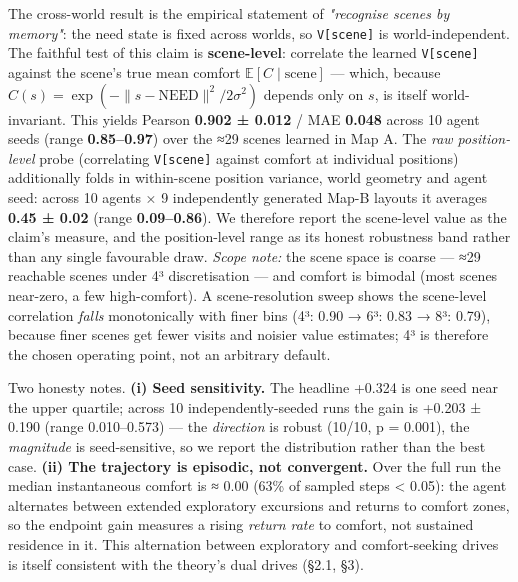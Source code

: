 \documentclass[11pt]{article}
\begin{document}
The cross-world result is the empirical statement of \emph{"recognise scenes by memory"}: the need state is fixed across worlds, so \texttt{V[scene]} is world-independent. The faithful test of this claim is \textbf{scene-level}: correlate the learned \texttt{V[scene]} against the scene's true mean comfort $\mathbb{E}[C \mid \text{scene}]$ — which, because $C(s)=\exp(-\lVert s-\text{NEED}\rVert^2/2\sigma^2)$ depends only on $s$, is itself world-invariant. This yields Pearson \textbf{0.902 ± 0.012} / MAE \textbf{0.048} across 10 agent seeds (range \textbf{0.85–0.97}) over the ≈29 scenes learned in Map A. The \emph{raw position-level} probe (correlating \texttt{V[scene]} against comfort at individual positions) additionally folds in within-scene position variance, world geometry and agent seed: across 10 agents × 9 independently generated Map-B layouts it averages \textbf{0.45 ± 0.02} (range \textbf{0.09–0.86}). We therefore report the scene-level value as the claim's measure, and the position-level range as its honest robustness band rather than any single favourable draw. \emph{Scope note:} the scene space is coarse — ≈29 reachable scenes under 4³ discretisation — and comfort is bimodal (most scenes near-zero, a few high-comfort). A scene-resolution sweep shows the scene-level correlation \emph{falls} monotonically with finer bins (4³: 0.90 → 6³: 0.83 → 8³: 0.79), because finer scenes get fewer visits and noisier value estimates; 4³ is therefore the chosen operating point, not an arbitrary default.

Two honesty notes. \textbf{(i) Seed sensitivity.} The headline +0.324 is one seed near the upper quartile; across 10 independently-seeded runs the gain is +0.203 ± 0.190 (range 0.010–0.573) — the \emph{direction} is robust (10/10, p = 0.001), the \emph{magnitude} is seed-sensitive, so we report the distribution rather than the best case. \textbf{(ii) The trajectory is episodic, not convergent.} Over the full run the median instantaneous comfort is ≈ 0.00 (63\% of sampled steps < 0.05): the agent alternates between extended exploratory excursions and returns to comfort zones, so the endpoint gain measures a rising \emph{return rate} to comfort, not sustained residence in it. This alternation between exploratory and comfort-seeking drives is itself consistent with the theory's dual drives (§2.1, §3).
\end{document}
